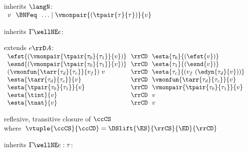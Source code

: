 \begin{flushleft}

\begin{minipage}[t]{\columnwidth}
 inherits $\langN$:\\
$\begin{array}{l@{~~}c@{~~}l}
  v & \BNFeq & \ldots \mid \vmonpair{(\tpair{\tau}{\tau})}{v}
\end{array}$

\smallskip
{} inherits $\Gamma \wellNE e$:\\[-1.4ex]
\begin{mathpar}
\end{mathpar}

\smallskip
{} extends $e \rrD A$:\\
$\begin{array}{l@{~~}c@{~~}l}
  \efst{(\vmonpair{\tpair{\tau_0}{\tau_1}}{v})} & \rrCD & \esta{\tau_0}{(\efst{v})}
\\
  \esnd{(\vmonpair{\tpair{\tau_0}{\tau_1}}{v})} & \rrCD & \esta{\tau_1}{(\esnd{v})}
\\
  (\vmonfun{\tarr{\tau_d}{\tau_c}}{v_f})~v & \rrCD & \esta{\tau_c}{(v_f~(\edyn{\tau_d}{v}))}
\\
  \esta{\tarr{\tau_d}{\tau_c}}{v} & \rrCD & \vmonfun{\tarr{\tau_d}{\tau_c}}{v}
\\
  \esta{\tpair{\tau_0}{\tau_1}}{v} & \rrCD & \vmonpair{\tpair{\tau_0}{\tau_1}}{v}
\\
  \esta{\tint}{v} & \rrCD & v
\\
  \esta{\tnat}{v} & \rrCD & v
\end{array}$

\smallskip
{} reflexive, transitive closure of $\ccCS$\\
\mbox{\quad where $\vtuple{\ccCS}{\ccCD} = \DSlift{\ES}{\rrCS}{\ED}{\rrCD}$}
\smallskip
\end{minipage}\hspace{\columnsep}%
\begin{minipage}[t]{\columnwidth}
 inherits $\Gamma \wellNE e : \tau$:\\[-1.4ex]
\begin{mathpar}
\end{mathpar}


\end{minipage}
\end{flushleft}

